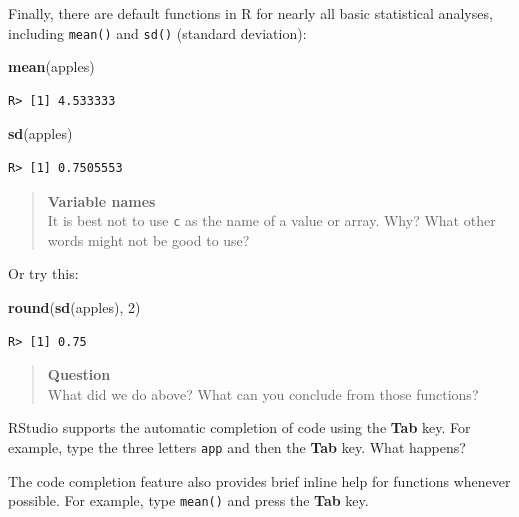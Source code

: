 \documentclass[]{book}
\newenvironment{Shaded}{\begin{snugshade}}{\end{snugshade}}
\newcommand{\KeywordTok}[1]{\textcolor[rgb]{0.13,0.29,0.53}{\textbf{#1}}}
\newcommand{\DecValTok}[1]{\textcolor[rgb]{0.00,0.00,0.81}{#1}}
\newcommand{\NormalTok}[1]{#1}
\theoremstyle{definition}
\theoremstyle{definition}
\theoremstyle{definition}
\theoremstyle{remark}
\begin{document}
Finally, there are default functions in R for nearly all basic
statistical analyses, including \texttt{mean()} and \texttt{sd()}
(standard deviation):

\begin{Shaded}
\begin{Highlighting}[]
\KeywordTok{mean}\NormalTok{(apples)}
\end{Highlighting}
\end{Shaded}

\begin{verbatim}
R> [1] 4.533333
\end{verbatim}

\begin{Shaded}
\begin{Highlighting}[]
\KeywordTok{sd}\NormalTok{(apples)}
\end{Highlighting}
\end{Shaded}

\begin{verbatim}
R> [1] 0.7505553
\end{verbatim}

\begin{quote}
\textbf{Variable names}\\
It is best not to use \texttt{c} as the name of a value or array. Why?
What other words might not be good to use?
\end{quote}

Or try this:

\begin{Shaded}
\begin{Highlighting}[]
\KeywordTok{round}\NormalTok{(}\KeywordTok{sd}\NormalTok{(apples), }\DecValTok{2}\NormalTok{)}
\end{Highlighting}
\end{Shaded}

\begin{verbatim}
R> [1] 0.75
\end{verbatim}

\begin{quote}
\textbf{Question}\\
What did we do above? What can you conclude from those functions?
\end{quote}

RStudio supports the automatic completion of code using the \textbf{Tab}
key. For example, type the three letters \texttt{app} and then the
\textbf{Tab} key. What happens?

The code completion feature also provides brief inline help for
functions whenever possible. For example, type \texttt{mean()} and press
the \textbf{Tab} key.
\end{document}
